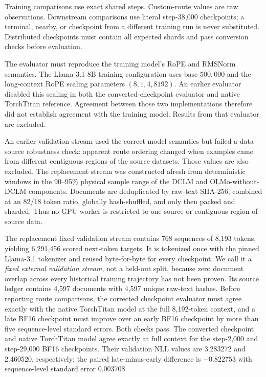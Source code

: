 Training comparisons use exact shared steps. Custom-route values are raw
observations. Downstream comparisons use literal step-38,000
checkpoints; a terminal, nearby, or checkpoint from a different training run
is never substituted. Distributed checkpoints must contain all expected
shards and pass conversion checks before evaluation.

The evaluator must reproduce the training model's RoPE and RMSNorm semantics.
The Llama-3.1 8B training configuration uses base $500{,}000$ and the
long-context RoPE scaling parameters $(8,1,4,8192)$. An earlier evaluator
disabled this scaling in both the converted-checkpoint evaluator and native
TorchTitan reference. Agreement between those two implementations therefore
did not establish agreement with the training model. Results from that
evaluator are excluded.

An earlier validation stream used the correct model semantics but failed a
data-source robustness check: apparent route ordering changed when examples
came from different contiguous regions of the source datasets. Those values
are also excluded. The replacement stream was constructed afresh from
deterministic windows in the 90--95\% physical sample range of the DCLM and
OLMo-without-DCLM components. Documents are deduplicated by raw-text SHA-256,
combined at an 82/18 token ratio, globally hash-shuffled, and only then packed
and sharded. Thus no GPU worker is restricted to one source or contiguous
region of source data.

The replacement fixed validation stream contains 768 sequences of 8,193 tokens, yielding
6,291,456 scored next-token targets. It is tokenized once with the pinned
Llama-3.1 tokenizer and reused byte-for-byte for every checkpoint. We call it
a \emph{fixed external validation stream}, not a held-out split, because zero
document overlap across every historical training trajectory has not been
proven. Its source ledger contains 4,597 documents with
4,597 unique raw-text hashes. Before reporting route comparisons, the
corrected checkpoint evaluator must agree exactly with the native TorchTitan
model at the full 8,192-token context, and a late BF16 checkpoint must improve
over an early BF16 checkpoint by more than five sequence-level standard
errors. Both checks pass. The converted checkpoint and native TorchTitan model
agree exactly at full context for the step-2,000 and step-29,000 BF16
checkpoints. Their validation NLL values are 3.283272 and 2.460520,
respectively; the paired late-minus-early difference is $-0.822753$ with
sequence-level standard error 0.003708.

